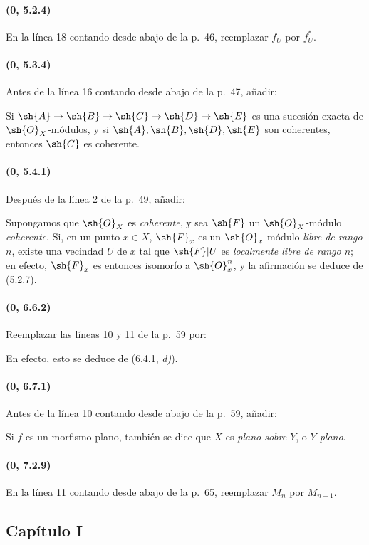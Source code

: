 \paragraph{(0, 5.2.4)}
En la línea 18 contando desde abajo de la p.~46, reemplazar $f_U$ por
$f_U^*$.

\paragraph{(0, 5.3.4)}
Antes de la línea 16 contando desde abajo de la p.~47, añadir:

Si
$\sh{A}\to\sh{B}\to\sh{C}\to\sh{D}\to\sh{E}$
es una sucesión exacta de $\sh{O}_X$-módulos, y si
$\sh{A},\sh{B},\sh{D},\sh{E}$ son coherentes, entonces $\sh{C}$ es
coherente.

\paragraph{(0, 5.4.1)}
Después de la línea 2 de la p.~49, añadir:

Supongamos que $\sh{O}_X$ es \emph{coherente}, y sea $\sh{F}$ un
$\sh{O}_X$-módulo \emph{coherente}. Si, en un punto $x\in X$, $\sh{F}_x$ es
un $\sh{O}_x$-módulo \emph{libre de rango $n$}, existe una vecindad $U$ de $x$
tal que $\sh{F}|U$ es \emph{localmente libre de rango $n$}; en efecto,
$\sh{F}_x$ es entonces isomorfo a $\sh{O}_x^n$, y la afirmación se
deduce de (5.2.7).

\paragraph{(0, 6.6.2)}
Reemplazar las líneas 10 y 11 de la p.~59 por:

En efecto, esto se deduce de (6.4.1, \emph{d)}).

\paragraph{(0, 6.7.1)}
Antes de la línea 10 contando desde abajo de la p.~59, añadir:

Si $f$ es un morfismo plano, también se dice que $X$ es
\emph{plano sobre $Y$}, o \emph{$Y$-plano}.

\paragraph{(0, 7.2.9)}
En la línea 11 contando desde abajo de la p.~65, reemplazar $M_n$ por
$M_{n-1}$.

\subsection*{Capítulo I}

